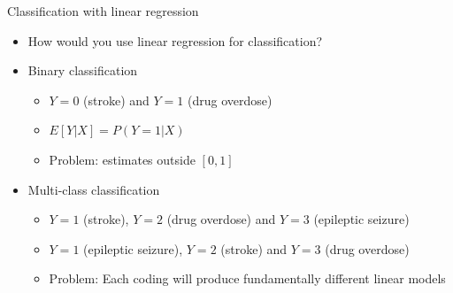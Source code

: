 \documentclass[14pt]{beamer}
\begin{document}
\begin{frame}{\large Classification with linear regression}\large

\begin{itemize}
	\item How would you use linear regression for classification?
	\item Binary classification
	\begin{itemize}
	\item $Y = 0$ (stroke) and $Y = 1$ (drug overdose) \pause
	\item $E[Y | X] = P(Y = 1|X)$
	\item Problem: estimates outside $[0, 1]$ \pause
	\end{itemize}
	
	\item Multi-class classification
	\begin{itemize}
	\item $Y = 1$ (stroke), $Y = 2$ (drug overdose) and $Y = 3$ (epileptic seizure) \pause
	\item $Y = 1$ (epileptic seizure), $Y = 2$ (stroke) and $Y = 3$ (drug overdose) \pause
	\item Problem: Each coding will produce fundamentally different linear models
	\end{itemize}
	
\end{itemize}

\end{frame}
\end{document}
